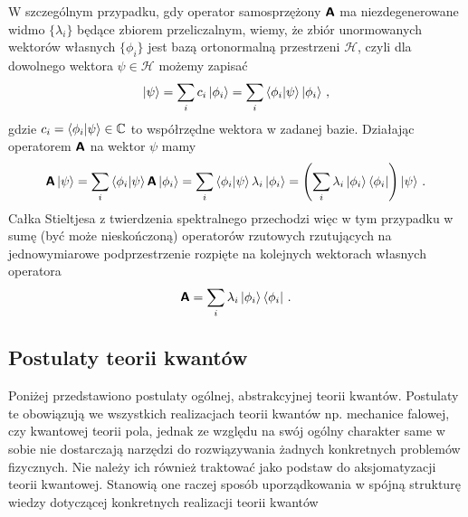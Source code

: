 \documentclass{myclass}
\begin{document}
W szczególnym przypadku, gdy operator samosprzężony \(\boldsymbol{\mathsf{A}}\) ma niezdegenerowane widmo
\(\{\lambda_i\}\) będące zbiorem przeliczalnym, wiemy, że zbiór unormowanych wektorów własnych
\(\{\phi_i\}\) jest bazą ortonormalną przestrzeni \(\mathscr{H}\), czyli dla dowolnego wektora
\(\psi \in \mathscr{H}\) możemy zapisać
\begin{equation*}
    \ket{\psi} = \sum_{i} c_i\ket{\phi_i} = \sum_{i} \braket{\phi_i}{\psi}\ket{\phi_i}\,,
\end{equation*}
gdzie \(c_i = \braket{\phi_i}{\psi} \in \mathbb{C}\) to współrzędne wektora w zadanej bazie.
Działając operatorem \(\boldsymbol{\mathsf{A}}\) na wektor \(\psi\) mamy
\begin{equation*}
    \boldsymbol{\mathsf{A}}\ket{\psi} = \sum_{i} \braket{\phi_i}{\psi}\boldsymbol{\mathsf{A}}\ket{\phi_i} =
    \sum_{i} \braket{\phi_i}{\psi}\lambda_i\ket{\phi_i} = \left(\sum_i\lambda_i\ket{\phi_i}\bra{\phi_i}\right)\ket{\psi} \,.
\end{equation*}
Całka Stieltjesa z twierdzenia spektralnego przechodzi więc w tym przypadku w sumę (być może
nieskończoną) operatorów rzutowych rzutujących na jednowymiarowe podprzestrzenie rozpięte na
kolejnych wektorach własnych operatora
\begin{equation*}
    \boldsymbol{\mathsf{A}} = \sum_{i} \lambda_i \ket{\phi_i}\bra{\phi_i}\,.
\end{equation*}

\subsection{Postulaty teorii kwantów}

Poniżej przedstawiono postulaty ogólnej, abstrakcyjnej teorii kwantów. Postulaty te obowiązują we
wszystkich realizacjach teorii kwantów np. mechanice falowej, czy kwantowej teorii pola, jednak ze
względu na swój ogólny charakter same w sobie nie dostarczają narzędzi do rozwiązywania żadnych
konkretnych problemów fizycznych. Nie należy ich również traktować jako podstaw do aksjomatyzacji
teorii kwantowej. Stanowią one raczej sposób uporządkowania w spójną strukturę wiedzy dotyczącej
konkretnych realizacji teorii kwantów
\medskip
\end{document}
